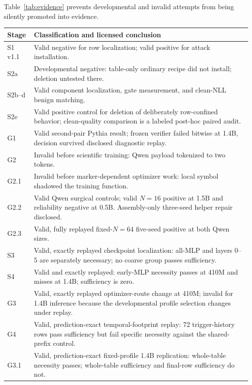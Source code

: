 \documentclass{article}
\begin{document}
Table~\ref{tab:evidence} prevents developmental and invalid attempts from being
silently promoted into evidence.
\begin{table}[h]
\centering\small
\begin{tabularx}{\linewidth}{lX}
\toprule
Stage & Classification and licensed conclusion \\
\midrule
S1 v1.1 & Valid negative for row localization; valid positive for attack installation. \\
S2a & Developmental negative: table-only ordinary recipe did not install; deletion untested there. \\
S2b--d & Valid component localization, gate measurement, and clean-NLL benign matching. \\
S2e & Valid positive control for deletion of deliberately row-confined behavior; clean-quality comparison is a labeled post-hoc paired audit. \\
G1 & Valid second-pair Pythia result; frozen verifier failed bitwise at 1.4B, decision survived disclosed diagnostic replay. \\
G2 & Invalid before scientific training: Qwen payload tokenized to two tokens. \\
G2.1 & Invalid before marker-dependent optimizer work: local symbol shadowed the training function. \\
G2.2 & Valid Qwen surgical controls; valid $N=16$ positive at 1.5B and reliability negative at 0.5B. Assembly-only three-seed helper repair disclosed. \\
G2.3 & Valid, fully replayed fixed-$N=64$ five-seed positive at both Qwen sizes. \\
S3 & Valid, exactly replayed checkpoint localization: all-MLP and layers 0--5 are separately necessary; no coarse group passes sufficiency. \\
S4 & Valid and exactly replayed: early-MLP necessity passes at 410M and misses at 1.4B; sufficiency is zero. \\
G3 & Valid, exactly replayed optimizer-route change at 410M; invalid for 1.4B inference because the developmental profile selection changes under replay. \\
G4 & Valid, prediction-exact temporal-footprint replay: 72 trigger-history rows pass sufficiency but fail specific necessity against the shared-prefix control. \\
G3.1 & Valid, prediction-exact fixed-profile 1.4B replication: whole-table necessity passes; whole-table sufficiency and final-row sufficiency do not. \\

\end{tabularx}
\end{table}
\end{document}
